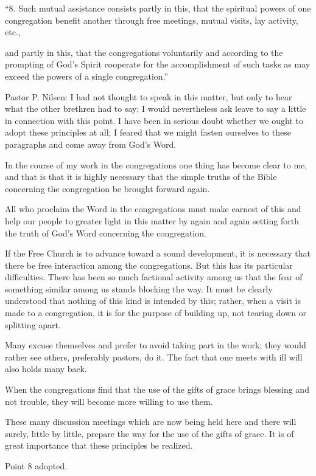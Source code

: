 “8. Such mutual assistance consists partly in this, that the spiritual powers of one congregation benefit another through free meetings, mutual visits, lay activity, etc.,

and partly in this, that the congregations voluntarily and according to the prompting of God’s Spirit cooperate for the accomplishment of such tasks as may exceed the powers of a single congregation.”

Pastor P. Nilsen: I had not thought to speak in this matter, but only to hear what the other brethren had to say; I would nevertheless ask leave to say a little in connection with this point. I have been in serious doubt whether we ought to adopt these principles at all; I feared that we might fasten ourselves to these paragraphs and come away from God’s Word.

In the course of my work in the congregations one thing has become clear to me, and that is that it is highly necessary that the simple truths of the Bible concerning the congregation be brought forward again.

All who proclaim the Word in the congregations must make earnest of this and help our people to greater light in this matter by again and again setting forth the truth of God’s Word concerning the congregation.

If the Free Church is to advance toward a sound development, it is necessary that there be free interaction among the congregations. But this has its particular difficulties. There has been so much factional activity among us that the fear of something similar among us stands blocking the way. It must be clearly understood that nothing of this kind is intended by this; rather, when a visit is made to a congregation, it is for the purpose of building up, not tearing down or splitting apart.

Many excuse themselves and prefer to avoid taking part in the work; they would rather see others, preferably pastors, do it. The fact that one meets with ill will also holds many back.

When the congregations find that the use of the gifts of grace brings blessing and not trouble, they will become more willing to use them.

These many discussion meetings which are now being held here and there will surely, little by little, prepare the way for the use of the gifts of grace. It is of great importance that these principles be realized.

Point 8 adopted.


